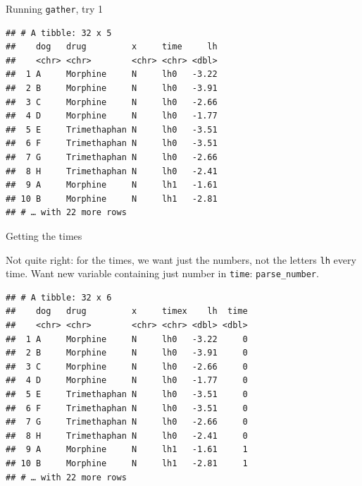 \documentclass[ignorenonframetext,]{beamer}
\newenvironment{Shaded}{\begin{snugshade}}{\end{snugshade}}
\newcommand{\DataTypeTok}[1]{\textcolor[rgb]{0.13,0.29,0.53}{#1}}
\newcommand{\KeywordTok}[1]{\textcolor[rgb]{0.13,0.29,0.53}{\textbf{#1}}}
\newcommand{\NormalTok}[1]{#1}
\newcommand{\OperatorTok}[1]{\textcolor[rgb]{0.81,0.36,0.00}{\textbf{#1}}}
\newcommand{\StringTok}[1]{\textcolor[rgb]{0.31,0.60,0.02}{#1}}
\begin{document}
\begin{frame}[fragile]{Running \texttt{gather}, try 1}
\protect\hypertarget{running-gather-try-1}{}

\footnotesize

\begin{Shaded}
\end{Shaded}

\begin{verbatim}
## # A tibble: 32 x 5
##    dog   drug         x     time     lh
##    <chr> <chr>        <chr> <chr> <dbl>
##  1 A     Morphine     N     lh0   -3.22
##  2 B     Morphine     N     lh0   -3.91
##  3 C     Morphine     N     lh0   -2.66
##  4 D     Morphine     N     lh0   -1.77
##  5 E     Trimethaphan N     lh0   -3.51
##  6 F     Trimethaphan N     lh0   -3.51
##  7 G     Trimethaphan N     lh0   -2.66
##  8 H     Trimethaphan N     lh0   -2.41
##  9 A     Morphine     N     lh1   -1.61
## 10 B     Morphine     N     lh1   -2.81
## # … with 22 more rows
\end{verbatim}

\normalsize

\end{frame}

\begin{frame}[fragile]{Getting the times}
\protect\hypertarget{getting-the-times}{}

Not quite right: for the times, we want just the numbers, not the
letters \texttt{lh} every time. Want new variable containing just number
in \texttt{time}: \texttt{parse\_number}.

\footnotesize

\begin{Shaded}
\end{Shaded}

\begin{verbatim}
## # A tibble: 32 x 6
##    dog   drug         x     timex    lh  time
##    <chr> <chr>        <chr> <chr> <dbl> <dbl>
##  1 A     Morphine     N     lh0   -3.22     0
##  2 B     Morphine     N     lh0   -3.91     0
##  3 C     Morphine     N     lh0   -2.66     0
##  4 D     Morphine     N     lh0   -1.77     0
##  5 E     Trimethaphan N     lh0   -3.51     0
##  6 F     Trimethaphan N     lh0   -3.51     0
##  7 G     Trimethaphan N     lh0   -2.66     0
##  8 H     Trimethaphan N     lh0   -2.41     0
##  9 A     Morphine     N     lh1   -1.61     1
## 10 B     Morphine     N     lh1   -2.81     1
## # … with 22 more rows
\end{verbatim}

\normalsize

\end{frame}
\end{document}

